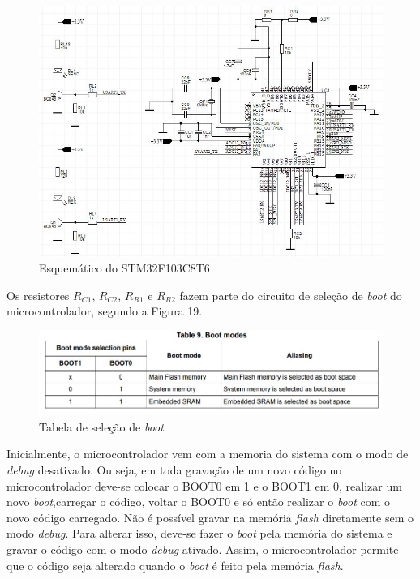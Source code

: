 \documentclass[11pt]{abntex2}
\begin{document}
					\begin{figure}[!ht]
						\centering
						\includegraphics[width=\linewidth]{../Fotos/stmEsquematico.jpg}
						\caption{Esquemático do STM32F103C8T6}
					\end{figure}

					Os resistores $R_{C1}$, $R_{C2}$, $R_{R1}$ e $R_{R2}$ fazem
					parte do circuito de seleção de \textit{boot} do
					microcontrolador, segundo a Figura 19.

					\begin{figure}[!ht]
						\centering
						\includegraphics[width=\linewidth]{../Fotos/bootTable.jpg}
						\caption[Tabela de seleção de \textit{boot}]{Tabela de seleção de \textit{boot}\footnotemark}
					\end{figure}

					Inicialmente, o microcontrolador vem com a memoria do
					sistema com o modo de \textit{debug} desativado. Ou seja, em
					toda gravação de um novo código no microcontrolador deve-se
					colocar o BOOT0 em 1 e o BOOT1 em 0, realizar um novo
					\textit{boot},carregar o código, voltar o BOOT0 e só então
					realizar o \textit{boot} com o novo código carregado. Não é
					possível gravar na memória \textit{flash} diretamente sem o
					modo \textit{debug}. Para alterar isso, deve-se fazer o
					\textit{boot} pela memória do sistema e gravar o código com
					o modo \textit{debug} ativado. Assim, o microcontrolador
					permite que o código seja alterado quando o \textit{boot} é
					feito pela memória \textit{flash}.
\end{document}
